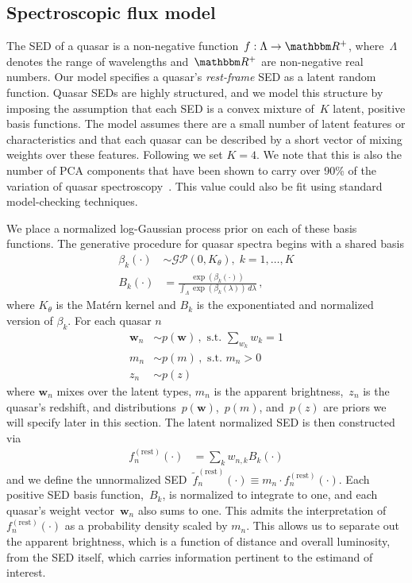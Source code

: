 \documentclass{article} %
\begin{document}
\subsection{Spectroscopic flux model}
The SED of a quasar is a non-negative function~${f : \Lambda \rightarrow \R^+}$, where~$\Lambda$ denotes the range of wavelengths and~$\R^+$ are non-negative real numbers.
Our model specifies a quasar's \emph{rest-frame} SED as a latent random function. 
Quasar SEDs are highly structured, and we model this structure by imposing the assumption that each SED is a convex mixture of~$K$ latent, positive basis functions. 
The model assumes there are a small number of latent features or characteristics and that each quasar can be described by a short vector of mixing weights over these features.  
Following \citet{budavari2001photometric} we set ${K = 4}$. 
We note that this is also the number of PCA components that have been shown to carry over 90\% of the variation of quasar spectroscopy~\citet{suzuki2006quasar}.  
This value could also be fit using standard model-checking techniques.

We place a normalized log-Gaussian process prior on each of these basis functions.  
The generative procedure for quasar spectra begins with a shared basis
\begin{align}
  \beta_k(\cdot) &\sim \mathcal{GP}(0, K_\theta),\; k=1, \dots, K\\
  B_k(\cdot) &= \frac{\exp(\beta_k(\cdot))}{\int_\Lambda \exp(\beta_k(\lambda))\, d\lambda}   \, ,
\end{align}
where $K_{\theta}$ is the Mat\'{e}rn kernel and $B_k$ is the exponentiated and normalized version of $\beta_k$. For each quasar $n$
\begin{align}
  \mathbf{w}_n &\sim p(\mathbf{w}) \, , \text{ s.t. } \sum_{w_k} w_k = 1  \\
  m_n  &\sim p(m) \, , \text{ s.t. } m_n > 0 \\
  z_n &\sim p(z)
\end{align}
where $\mathbf{w}_n$ mixes over the latent types, $m_n$ is the apparent brightness,~$z_n$ is the quasar's redshift, and distributions~$p(\mathbf{w})$,~$p(m)$, and~$p(z)$ are priors we will specify later in this section. 
The latent normalized SED is then constructed via
\begin{align}
  f^{(\text{rest})}_n(\cdot) &= \sum_{k} w_{n,k} B_k(\cdot)
  \label{eqn:restsed}
\end{align}
and we define the unnormalized SED~${\tilde f^{(\text{rest})}_n(\cdot) \equiv m_n \cdot f^{(\text{rest})}_n(\cdot)}$. 
Each positive SED basis function,~$B_k$, is normalized to integrate to one, and each quasar's weight vector~$\mathbf{w}_n$ also sums to one.
This admits the interpretation of~$f^{(\text{rest})}_n(\cdot)$ as a probability density scaled by $m_n$. 
This allows us to separate out the apparent brightness, which is a function of distance and overall luminosity, from the SED itself, which carries information pertinent to the estimand of interest. 
\end{document}
